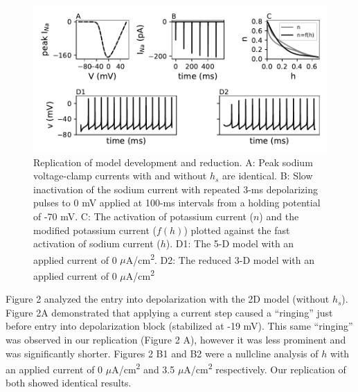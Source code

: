 \begin{figure}
	\centering
	\includegraphics[scale=0.7]{../figures/figure_1.pdf}
	\caption{Replication of model development and reduction. A: Peak sodium voltage-clamp currents with and without $h_{s}$ are identical. B: Slow inactivation of the sodium current with repeated 3-ms depolarizing pulses to 0 mV applied at 100-ms intervals from a holding potential of -70 mV. C: The activation of potassium current ($n$) and the modified potassium current ($f(h)$) plotted against the fast activation of sodium current ($h$). D1: The 5-D model with an applied current of 0 $\mu$A/cm\textsuperscript{2}. D2: The reduced 3-D model with an applied current of 0 $\mu$A/cm\textsuperscript{2}}
	\label{fig:1}
\end{figure}

Figure 2 analyzed the entry into depolarization with the 2D model (without $h_s$). Figure 2A demonstrated that applying a current step caused a “ringing” just before entry into depolarization block (stabilized at -19 mV). This same “ringing” was observed in our replication (Figure 2 A), however it was less prominent and was significantly shorter. Figures 2 B1 and B2 were a nullcline analysis of $h$ with an applied current of 0 $\mu$A/cm\textsuperscript{2} and 3.5 $\mu$A/cm\textsuperscript{2} respectively. Our replication of both showed identical results.\\ 

